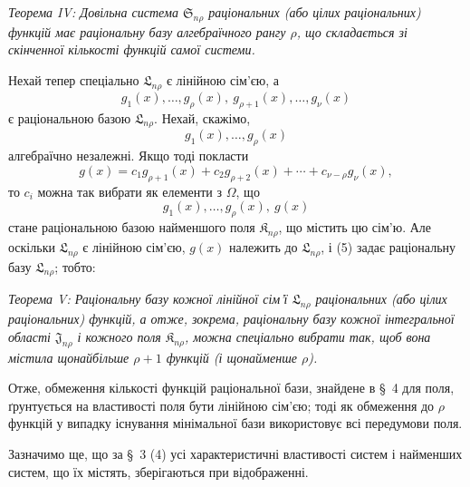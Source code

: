 \documentclass[11pt]{article}
\providecommand{\Kfield}{\mathfrak{K}}
\providecommand{\Ssys}{\mathfrak{S}}
\providecommand{\Jdom}{\mathfrak{J}}
\providecommand{\Lsys}{\mathfrak{L}}
\begin{document}
\emph{Теорема IV: Довільна система $\Ssys_{n\rho}$ раціональних (або цілих раціональних) функцій має раціональну базу алгебраїчного рангу $\rho$, що складається зі скінченної кількості функцій самої системи.}

Нехай тепер спеціально $\Lsys_{n\rho}$ є лінійною сім'єю, а
\begin{equation}
  g_1(x),\ldots,g_\rho(x),\ g_{\rho+1}(x),\ldots,g_\nu(x)
\tag{4}
\end{equation}
є раціональною базою $\Lsys_{n\rho}$. Нехай, скажімо,
\[
  g_1(x),\ldots,g_\rho(x)
\]
алгебраїчно незалежні. Якщо тоді покласти
\[
  g(x)=c_1g_{\rho+1}(x)+c_2g_{\rho+2}(x)+\cdots+c_{\nu-\rho}g_\nu(x),
\]
то $c_i$ можна так вибрати як елементи з $\Omega$, що
\begin{equation}
  g_1(x),\ldots,g_\rho(x),\ g(x)
\tag{5}
\end{equation}
стане раціональною базою найменшого поля $\Kfield_{n\rho}$, що містить цю сім'ю. Але оскільки $\Lsys_{n\rho}$ є лінійною сім'єю, $g(x)$ належить до $\Lsys_{n\rho}$, і (5) задає раціональну базу $\Lsys_{n\rho}$; тобто:

\emph{Теорема V: Раціональну базу кожної лінійної сім'ї $\Lsys_{n\rho}$ раціональних (або цілих раціональних) функцій, а отже, зокрема, раціональну базу кожної інтегральної області $\Jdom_{n\rho}$ і кожного поля $\Kfield_{n\rho}$, можна спеціально вибрати так, щоб вона містила щонайбільше $\rho+1$ функцій (і щонайменше $\rho$).}

Отже, обмеження кількості функцій раціональної бази, знайдене в \S\ 4 для поля, ґрунтується на властивості поля бути лінійною сім'єю; тоді як обмеження до $\rho$ функцій у випадку існування мінімальної бази використовує всі передумови поля.

Зазначимо ще, що за \S\ 3 (4) усі характеристичні властивості систем і найменших систем, що їх містять, зберігаються при відображенні.
\end{document}
